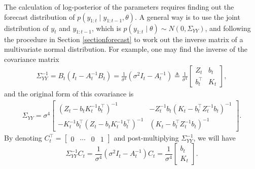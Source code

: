 The calculation of log-posterior of the parameters requires finding out the forecast distribution of $p(y_{1:t}\mid y_{1:t-1},\theta)$. A general way is to use the joint distribution of $y_{t}$ and $y_{1:t-1}$, which is $p(y_{1:t}\mid \theta)\sim N(0,\Sigma_{YY})$, and following the procedure in Section \ref{sectionforecast} to work out the inverse matrix of a multivariate normal distribution. For example, one may find the inverse of the covariance matrix 
\begin{align}
\Sigma_{YY}^{-1} = B_t(I_t-A_t^{-1}B_t) =\frac{1}{\sigma^4}(\sigma^2 I_t-A_t^{-1}) \triangleq \frac{1}{\sigma^4} 
\begin{bmatrix} 
Z_{t} & b_{t} \\
b_{t}^\top & K_{t}
\end{bmatrix},
\end{align}
and the original form of this covariance is 
\begin{align} \Sigma_{YY} =\sigma^4 \begin{bmatrix}
\left(Z_t-b_tK_t^{-1}b_t^\top\right)^{-1} & -Z_t^{-1}b_t\left(K_t-b_t^\top Z_t^{-1}b_t\right)^{-1}\\
-K_t^{-1}b_t^\top \left(Z_t-b_tK_t^{-1}b_t^\top\right)^{-1} & \left(K_t-b_t^\top Z_t^{-1}b_t\right)^{-1}
\end{bmatrix}. 
\end{align}
By denoting $C_{t}^\top = \begin{bmatrix} 0 & \cdots & 0 & 1\end{bmatrix}$ and post-multiplying $\Sigma_{YY}^{-1}$, we will have  
\begin{equation}\label{beforeSMformula}
\Sigma_{YY}^{-1} C_{t}= \frac{1}{\sigma^4}\left(\sigma^2 I_t-A_t^{-1} \right)C_{t}= \frac{1}{\sigma^4} \begin{bmatrix} b_{t} \\ K_{t} \end{bmatrix}.
\end{equation} 


